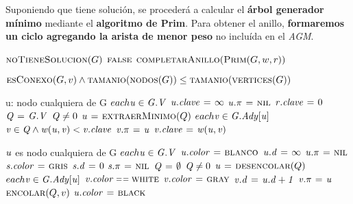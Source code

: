 Suponiendo que tiene solución, se procederá a calcular el \textbf{árbol 
generador mínimo} mediante el \textbf{algoritmo de Prim}. Para obtener el 
anillo, \textbf{formaremos un ciclo agregando la arista de menor peso} no 
incluída en el \textit{AGM}.


\begin{codebox}
\li \If $\textnormal{\scshape noTieneSolucion}(G)$
\li     \Then
            \Return $\textnormal{\scshape false}$
        \End
\li  \Return $\textnormal{\scshape completarAnillo}(\textnormal{\scshape Prim}(G,w,r))$
\end{codebox}


\begin{codebox}
\li \Return $\textnormal{\scshape esConexo}(G,v) \land
    \textnormal{\scshape tamanio}(\textnormal{\scshape nodos}(G)) \leq 
    \textnormal{\scshape tamanio}(\textnormal{\scshape vertices}(G))$
\end{codebox}


\begin{codebox}
\li \Comment u: nodo cualquiera de G
\li \For $each \id{u} \in \id{G.V}$
\li     \Do
            $\id{u.clave} \gets \infty$
            $\id{u.\pi} \gets \const{nil}$
        \End
\li $\id{r.clave} \gets 0$
\li $\id{Q} \gets \id{G.V}$
\li \While $\id{Q} \neq 0$
\li     \Do
            $\id{u} \gets \proc{extraerMinimo}(Q)$
\li         \For $each \id{v} \in \id{G.Ady[u]}$
\li             \Do
\li                 \If $\id{v} \in \id{Q} \land \id{w(u,v)} < \id{v.clave}$
\li                     \Then
                            $\id{v.\pi} \gets \id{u}$
                            $\id{v.clave} \gets \id{w(u,v)}$
                        \End
                \End
        \End
\end{codebox}


\begin{codebox}
\li \Comment $\id{u}$ es nodo cualquiera de G
\li \For $each \id{u} \in \id{G.V}$
\li     \Do
            $\id{u.color} \gets \const{blanco}$
            $\id{u.d} \gets \infty$
            $\id{u.\pi} \gets \const{nil}$
        \End
\li $\id{s.color} \gets \const{gris}$
\li $\id{s.d} \gets 0$
\li $\id{s.\pi} \gets \const{nil}$
\li $\id{Q} \gets \emptyset$
\li \While $\id{Q} \neq 0$
\li     \Do
            $\id{u} \gets \proc{desencolar}(Q)$
\li         \For $each \id{v} \in \id{G.Ady[u]}$
\li             \Do
\li                 \If $\id{v.color} \isequal \const{white}$
\li                     \Then
                            $\id{v.color} \gets \const{gray}$
                            $\id{v.d} \gets \id{u.d + 1}$
                            $\id{v.\pi} \gets \id{u}$
                            $\textnormal{\scshape encolar}(Q,v)$
                        \End
                \End
\li     $\id{u.color} \gets \const{black}$
        \End            
\end{codebox}


